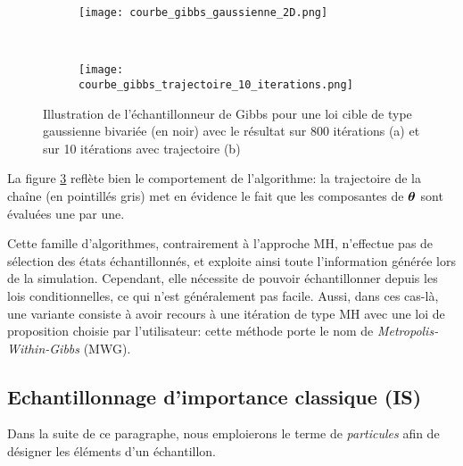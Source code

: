 \begin{figure}[h!]
	\centering
	\begin{subfigure}[t]{0.5\textwidth}
		\centering
		\texttt{[image: courbe\_gibbs\_gaussienne\_2D.png]}
		\caption{}
		\label{subfig_gibbs_all}
	\end{subfigure}%
	~ 
	\begin{subfigure}[t]{0.5\textwidth}
		\centering
		\texttt{[image: courbe\_gibbs\_trajectoire\_10\_iterations.png]}
		\caption{}
		\label{subfig_gibbs_10}
	\end{subfigure}
	\caption{Illustration de l'échantillonneur de Gibbs pour une loi cible de type gaussienne bivariée (en noir) avec le résultat sur 800 itérations (a) et sur 10 itérations avec trajectoire (b)}
\end{figure}

La figure \ref{subfig_gibbs_10} reflète bien le comportement de l'algorithme: la trajectoire de la chaîne (en pointillés gris) met en évidence le fait que les composantes de ${\bm{\theta}}$ sont évaluées une par une. 

Cette famille d'algorithmes, contrairement à l'approche MH, n'effectue pas de sélection des états échantillonnés, et exploite ainsi toute l'information générée lors de la simulation. Cependant, elle nécessite de pouvoir échantillonner depuis les lois conditionnelles, ce qui n'est généralement pas facile. Aussi, dans ces cas-là, une variante consiste à avoir recours à une itération de type MH avec une loi de proposition choisie par l'utilisateur: cette méthode porte le nom de \textit{Metropolis-Within-Gibbs} (MWG).\\

 
 \subsection{Echantillonnage d'importance classique (IS)}
 
 Dans la suite de ce paragraphe, nous emploierons le terme de \textit{particules} afin de désigner les éléments d'un échantillon.\\
 
